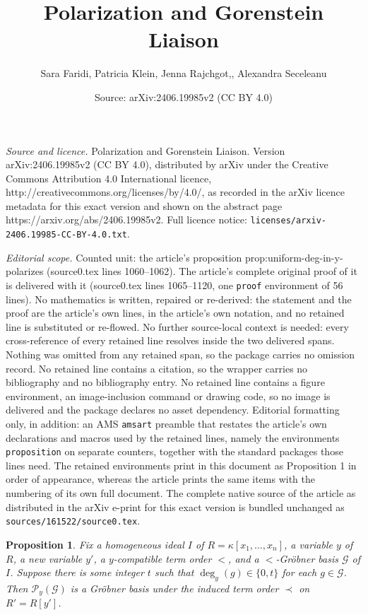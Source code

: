 \documentclass[10pt,a4paper]{amsart}
\title{Polarization and Gorenstein Liaison}
\author{Sara Faridi, Patricia Klein, Jenna Rajchgot,, Alexandra Seceleanu}
\date{Source: arXiv:2406.19985v2 (CC BY 4.0)}
\newtheorem{proposition}{Proposition}
\newcommand{\G}{\mathcal{G}}
\renewcommand{\P}{\mathcal{P}}
\begin{document}
\maketitle

\noindent\emph{Source and licence.} Polarization and Gorenstein Liaison. Version arXiv:2406.19985v2 (CC BY 4.0), distributed by arXiv under the Creative Commons Attribution 4.0 International licence, http://creativecommons.org/licenses/by/4.0/, as recorded in the arXiv licence metadata for this exact version and shown on the abstract page https://arxiv.org/abs/2406.19985v2. Full licence notice: \texttt{licenses/arxiv-2406.19985-CC-BY-4.0.txt}.\par\smallskip

\noindent\textit{Editorial scope.} Counted unit: the article's proposition prop:uniform-deg-in-y-polarizes (source0.tex lines 1060--1062). The article's complete original proof of it is delivered with it (source0.tex lines 1065--1120, one \texttt{proof} environment of 56 lines). No mathematics is written, repaired or re-derived: the statement and the proof are the article's own lines, in the article's own notation, and no retained line is substituted or re-flowed.  No further source-local context is needed: every cross-reference of every retained line resolves inside the two delivered spans.  Nothing was omitted from any retained span, so the package carries no omission record.  No retained line contains a citation, so the wrapper carries no bibliography and no bibliography entry.  No retained line contains a figure environment, an image-inclusion command or drawing code, so no image is delivered and the package declares no asset dependency.  Editorial formatting only, in addition: an AMS \texttt{amsart} preamble that restates the article's own declarations and macros used by the retained lines, namely the environments \texttt{proposition} on separate counters, together with the standard packages those lines need.  The retained environments print in this document as Proposition 1 in order of appearance, whereas the article prints the same items with the numbering of its own full document.  The complete native source of the article as distributed in the arXiv e-print for this exact version is bundled unchanged as \texttt{sources/161522/source0.tex}.
\begin{proposition}\label{prop:uniform-deg-in-y-polarizes}
Fix a homogeneous ideal $I$ of $R = \kappa[x_1, \ldots, x_n]$, a variable $y$ of $R$, a new variable $y'$, a $y$-compatible term order $<$, and a $<$-Gr\"obner basis $\G$ of $I$. Suppose there is some integer $t$ such that $\deg_y (g) \in \{0,t\}$ for each $g\in \G$. Then $\P_y (\G)$ is a Gr\"obner basis under the induced term order $\prec$ on $R' = R[y']$.
\end{proposition} 
\end{document}
